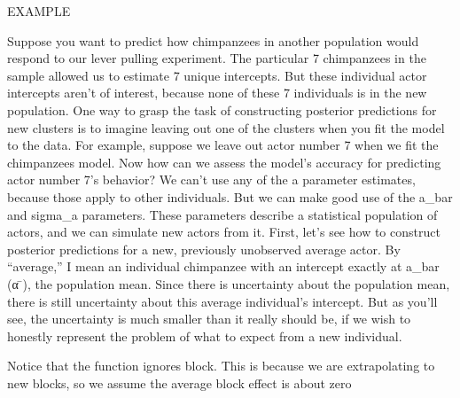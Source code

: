 \documentclass[
]{article}
\begin{document}
EXAMPLE

Suppose you want to predict how chimpanzees in another population would
respond to our lever pulling experiment. The particular 7 chimpanzees in
the sample allowed us to estimate 7 unique intercepts. But these
individual actor intercepts aren't of interest, because none of these 7
individuals is in the new population. One way to grasp the task of
constructing posterior predictions for new clusters is to imagine
leaving out one of the clusters when you fit the model to the data. For
example, suppose we leave out actor number 7 when we fit the chimpanzees
model. Now how can we assess the model's accuracy for predicting actor
number 7's behavior? We can't use any of the a parameter estimates,
because those apply to other individuals. But we can make good use of
the a\_bar and sigma\_a parameters. These parameters describe a
statistical population of actors, and we can simulate new actors from
it. First, let's see how to construct posterior predictions for a new,
previously unobserved average actor. By ``average,'' I mean an
individual chimpanzee with an intercept exactly at a\_bar (α ̄), the
population mean. Since there is uncertainty about the population mean,
there is still uncertainty about this average individual's intercept.
But as you'll see, the uncertainty is much smaller than it really should
be, if we wish to honestly represent the problem of what to expect from
a new individual.

Notice that the function ignores block. This is because we are
extrapolating to new blocks, so we assume the average block effect is
about zero
\end{document}
